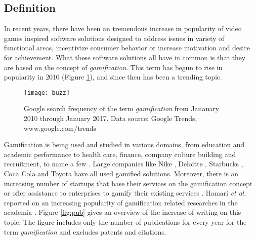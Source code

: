 \subsection{Definition}
In recent years, there have been an tremendous increase in popularity of video games inspired software solutions designed to address issues in variety of functional areas, incentivize consumer behavior or increase motivation and desire for achievement. What these software solutions all have in common is that they are based on the concept of \textit{gamification}. This term has begun to rise in popularity in 2010 (Figure \ref{fig:buzz}), and since then has been a trending topic. %
\begin{figure}[h]
    \centering
    \texttt{[image: buzz]}
    \caption{Google search frequency of the term \textit{gamification} from Janauary 2010 through January 2017. Data source: Google Trends, www.google.com/trends}
    \label{fig:buzz}
\end{figure}
Gamification is being used and studied in various domains, from education and academic performance to health care, finance, company culture building and recruitment, to name a few \cite{gamificationExamples, gamificationWiki, enterpriseGamify}. Large companies like Nike \cite{nikePlus}, Deloitte \cite{deloitte}, Starbucks \cite{starbucks}, Coca Cola \cite{coke} and Toyota \cite{toyota} have all used gamified solutions. %
Moreover, there is an increasing number of startups that base their services on the gamification concept \cite{codeacademy} or offer assistance to enterprises to gamify their existing services \cite{badgeville}. Hamari \textit{et al.} reported on an increasing popularity of gamification related researches in the academia \cite{hamari2014does}. Figure \ref{fig:pub} gives an overview of the increase of writing on this topic. The figure includes only the number of publications for every year for the term \textit{gamification} and excludes patents and citations. 
